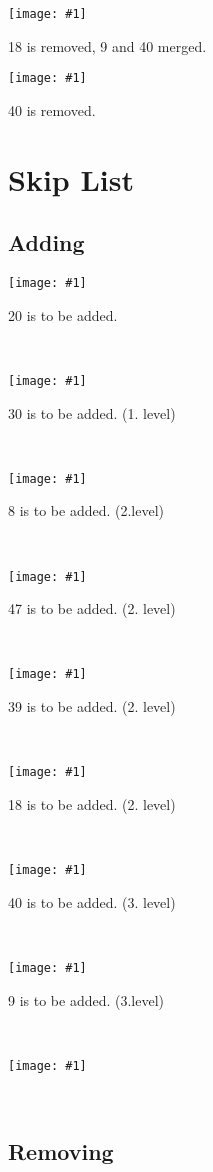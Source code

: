 \documentclass[a4paper]{article}
\newcommand{\image}[2] {
  \noindent\begin{minipage}[c]{.6\textwidth}%
    \centering
    \strut\vspace*{-\baselineskip}\newline\texttt{[image: \#1]}
  \end{minipage}%
  \hfill%
  \begin{minipage}[c]{.4\textwidth}
    #2
  \end{minipage}
}
\begin{document}
  \image{2-3/del/9.png}{18 is removed, 9 and 40 merged.}
  \vspace{2em}

  \image{2-3/del/10.png}{40 is removed.}
  
  \newpage
  \section{Skip List}

  \subsection{Adding}

  \image{skip/add/0.png}{20 is to be added.}\vspace{2em}\\
  \image{skip/add/1.png}{30 is to be added. (1. level)}\vspace{2em}\\
  \image{skip/add/2.png}{8 is to be added. (2.level)}\vspace{2em}\\
  \image{skip/add/3.png}{47 is to be added. (2. level) }\vspace{2em}\\
  \image{skip/add/4.png}{39 is to be added. (2. level) }\vspace{2em}\\
  \image{skip/add/5.png}{18 is to be added. (2. level) }\vspace{2em}\\
  \image{skip/add/5-1.png}{40 is to be added. (3. level) }\vspace{2em}\\
  \image{skip/add/6.png}{9 is to be added. (3.level)}\vspace{2em}\\
  \image{skip/add/7.png}{ }\vspace{2em}\\

  \subsection{Removing}
  
\end{document}
